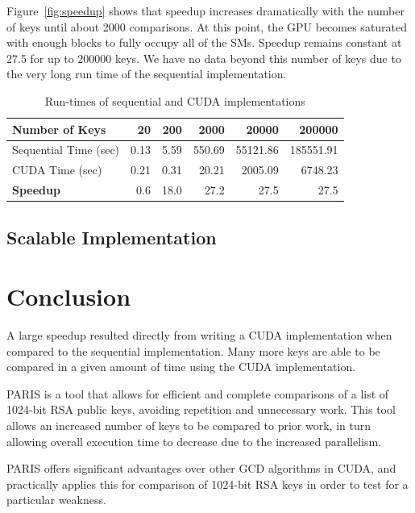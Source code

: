 \documentclass[smallextended]{svjour3}       %
\begin{document}
Figure~\ref{fig:speedup} shows that speedup increases dramatically with 
the number of keys until about 2000 comparisons. At this point, the GPU
becomes saturated with enough blocks to fully occupy all of the SMs. Speedup
remains constant at 27.5 for up to 200000 keys. We have no data beyond this
number of keys due to the very long run time of the sequential implementation. 

\begin{table}
   \centering
   \begin{tabular}{|l|*{5}{r}|}\hline
      Number of Keys        & 20   & 200  & 2000   & 20000    & 200000 \\ \hline
      Sequential Time (sec) & 0.13 & 5.59 & 550.69 & 55121.86 & 185551.91\\
      CUDA Time (sec)       & 0.21 & 0.31 & 20.21  & 2005.09  & 6748.23\\\hline
      \textbf{Speedup}      & 0.6  & 18.0 & 27.2   & 27.5     & 27.5\\\hline
   \end{tabular}
   \caption{Run-times of sequential and CUDA implementations}
   \label{tab:runtimes}
\end{table}

\subsection{Scalable Implementation}
\label{scaleimpl}


\section{Conclusion}
\label{sec:concl}
A large speedup resulted directly from writing a CUDA 
implementation when compared to the sequential implementation. Many 
more keys are able to be compared in a given amount of time using the CUDA
implementation. 

PARIS is a tool that allows for efficient and complete comparisons of a list of
1024-bit RSA public keys, avoiding repetition and unnecessary work. This tool
allows an increased number of keys to be compared to prior work, in turn
allowing overall execution time to decrease due to the increased parallelism.

PARIS offers significant advantages over other GCD algorithms in CUDA, and
practically applies this for comparison of 1024-bit RSA keys in order to test
for a particular weakness.
\end{document}
